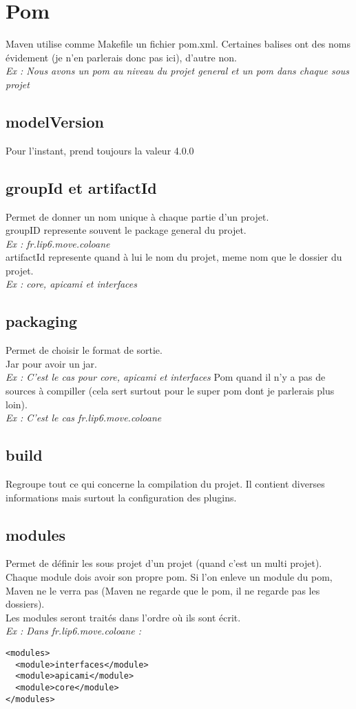 \documentclass[a4paper,10pt]{article}
\begin{document}
\section{Pom}
Maven utilise comme Makefile un fichier pom.xml. Certaines balises ont des noms évidement (je n'en parlerais donc pas ici), d'autre non.\\
\textit{Ex : Nous avons un pom au niveau du projet general et un pom dans chaque sous projet}

\subsection{modelVersion}
Pour l'instant, prend toujours la valeur 4.0.0

\subsection{groupId et artifactId}
Permet de donner un nom unique à chaque partie d'un projet.\\
groupID represente souvent le package general du projet.\\
\textit{Ex : fr.lip6.move.coloane}\\
artifactId represente quand à lui le nom du projet, meme nom que le dossier du projet.\\
\textit{Ex : core, apicami et interfaces}

\subsection{packaging}
Permet de choisir le format de sortie.\\
Jar pour avoir un jar.\\
\textit{Ex : C'est le cas pour core, apicami et interfaces}
Pom quand il n'y a pas de sources à compiller (cela sert surtout pour le super pom dont je parlerais plus loin).\\
\textit{Ex : C'est le cas fr.lip6.move.coloane}

\subsection{build}
Regroupe tout ce qui concerne la compilation du projet. Il contient diverses informations mais surtout la configuration des plugins.

\subsection{modules}
Permet de définir les sous projet d'un projet (quand c'est un multi projet). Chaque module dois avoir son propre pom. Si l'on enleve un module du pom, Maven ne le verra pas (Maven ne regarde que le pom, il ne regarde pas les dossiers).\\
Les modules seront traités dans l'ordre où ils sont écrit.\\
\textit{Ex : Dans fr.lip6.move.coloane : }
\begin{verbatim}
<modules>
  <module>interfaces</module>
  <module>apicami</module>
  <module>core</module>
</modules>
\end{verbatim}
\end{document}
